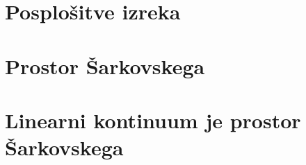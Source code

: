 \documentclass[ped, tisk]{fmfdelo}
\begin{document}
\section{Posplošitve izreka}\label{sec:circ}


\section{Prostor Šarkovskega}





\section{Linearni kontinuum je prostor Šarkovskega}

\end{document}
